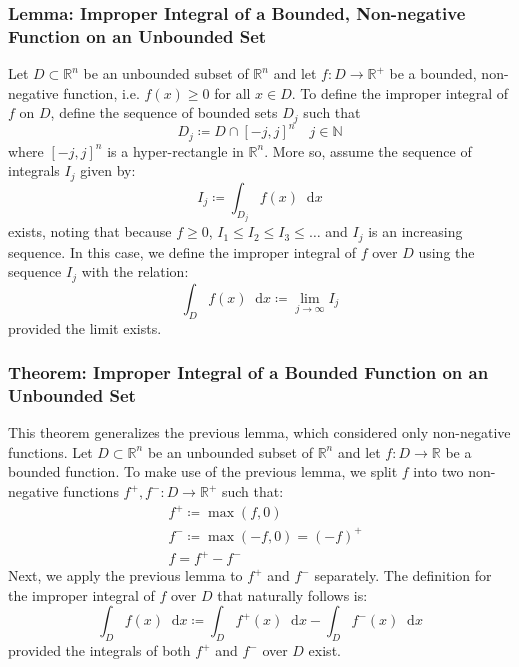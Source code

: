 \documentclass[11pt, a4paper]{article}
\newcommand{\diff}{\mathop{}\!\mathrm{d}} %
\begin{document}
\subsubsection{Lemma: Improper Integral of a Bounded, Non-negative Function on an Unbounded Set}
Let $ D \subset \mathbb{R}^n $ be an unbounded subset of $ \mathbb{R}^{n} $ and let $ f : D \rightarrow \mathbb{R}^{+} $ be a bounded, non-negative function, i.e. $ f(x) \geq 0 $ for all $ x \in D $. To define the improper integral of $ f $ on $ D $, define the sequence of bounded sets $ D_j $ such that
\begin{equation*}
	D_j \coloneqq D \cap [-j, j]^n \quad j \in \mathbb{N}
\end{equation*}
where $ [-j, j]^n $ is a hyper-rectangle in $ \mathbb{R}^n $. More so, assume the sequence of integrals $ I_j $ given by:
\begin{equation*}
	I_j \coloneqq \int_{D_j} f(x) \diff x
\end{equation*} 
exists, noting that because $ f \geq 0 $, $ I_1 \leq I_2 \leq I_3 \leq \dots $ and $ I_j $ is an increasing sequence. In this case, we define the improper integral of $ f $ over $ D $ using the sequence $ I_j $ with the relation:
\begin{equation*}
	\int_D f(x) \diff x \coloneqq \lim_{j \rightarrow \infty} I_j
\end{equation*}
provided the limit exists.

\subsubsection{Theorem: Improper Integral of a Bounded Function on an Unbounded Set}
This theorem generalizes the previous lemma, which considered only non-negative functions. Let $ D \subset \mathbb{R}^n $ be an unbounded subset of $ \mathbb{R}^{n} $ and let $ f : D \rightarrow \mathbb{R} $ be a bounded function. To make use of the previous lemma, we split $ f $ into two non-negative functions $ f^{+}, f^{-}: D \rightarrow \mathbb{R}^{+}$ such that:
\begin{align*}
	&f^{+} \coloneqq \max(f, 0)\\
	&f^{-} \coloneqq \max(-f, 0) = (-f)^+\\
	&f = f^+ - f^-
\end{align*}
Next, we apply the previous lemma to $ f^+ $ and $ f^- $ separately. The definition for the improper integral of $ f $ over $ D $ that naturally follows is:
\begin{equation*}
	\int_D f(x) \diff x \coloneqq \int_D f^+(x) \diff x - \int_D f^-(x) \diff x
\end{equation*}
provided the integrals of both $ f^+ $ and $ f^- $ over $ D $ exist.
\end{document}
